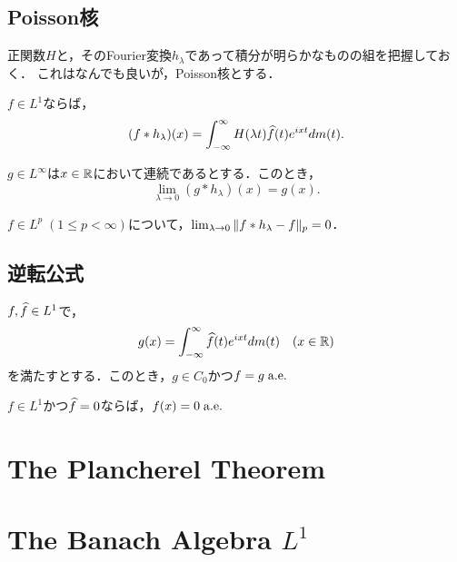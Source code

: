 \documentclass[uplatex,dvipdfmx]{jsreport}
\begin{document}
\subsection{Poisson核}

\begin{tcolorbox}[colframe=ForestGreen, colback=ForestGreen!10!white,breakable,colbacktitle=ForestGreen!40!white,coltitle=black,fonttitle=\bfseries\sffamily,
title=]
    正関数$H$と，そのFourier変換$h_\lambda$であって積分が明らかなものの組を把握しておく．
    これはなんでも良いが，Poisson核とする．
\end{tcolorbox}

\begin{proposition}
    $f\in L^1$ならば，
    \[(f*h_\lambda)(x)=\int^\infty_{-\infty}H(\lambda t)\widehat{f}(t)e^{ixt}dm(t).\]
\end{proposition}

\begin{proposition}
    $g\in L^\infty$は$x\in\mathbb{R}$において連続であるとする．このとき，
    \[\lim_{\lambda\to 0}(g*h_\lambda)(x)=g(x).\]
\end{proposition}

\begin{proposition}
    $f\in L^p\;(1\le p<\infty)$について，$\lim_{\lambda\to0}\|f*h_\lambda-f\|_p=0$．
\end{proposition}

\subsection{逆転公式}

\begin{theorem}
    $f,\widehat{f}\in L^1$で，
    \[g(x)=\int^\infty_{-\infty}\widehat{f}(t)e^{ixt}dm(t)\quad(x\in\mathbb{R})\]
    を満たすとする．このとき，$g\in C_0$かつ$f=g\;\mathrm{a.e.}\;$
\end{theorem}

\begin{theorem}
    $f\in L^1$かつ$\widehat{f}=0$ならば，$f(x)=0\;\mathrm{a.e.}\;$
\end{theorem}

\section{The Plancherel Theorem}

\section{The Banach Algebra $L^1$}
\end{document}

